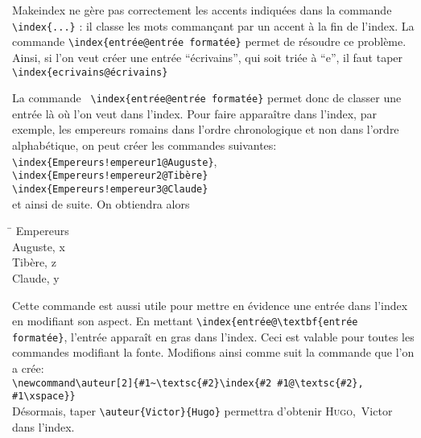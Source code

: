 Makeindex ne gère pas correctement les accents indiquées dans la commande \verb+\index{...}+ : il classe les mots commançant par un accent à la fin de l'index. La commande \verb+\index{entrée@entrée formatée}+ permet de résoudre ce problème. Ainsi, si l'on veut créer une entrée \enquote{écrivains}, qui soit triée à \enquote{e}, il faut taper \verb+\index{ecrivains@écrivains}+

La commande \verb+ \index{entrée@entrée formatée}+ permet donc de classer une entrée là où l'on veut dans l'index. Pour faire apparaître dans l'index, par exemple, les empereurs romains dans l'ordre chronologique et non dans l'ordre alphabétique, on peut créer les commandes suivantes:\\
\verb+\index{Empereurs!empereur1@Auguste}+,\\ \verb+\index{Empereurs!empereur2@Tibère}+\\
\verb+\index{Empereurs!empereur3@Claude}+\\
et ainsi de suite. On obtiendra alors
\begin{tabbing}
\hspace{0,5cm} \= \kill
Empereurs\\
\> Auguste, x\\
\> Tibère, z\\
\> Claude, y \\

\end{tabbing}

Cette commande est aussi utile pour mettre en évidence une entrée dans l'index en modifiant son aspect. En mettant \verb+\index{entrée@\textbf{entrée formatée}+, l'entrée apparaît en gras dans l'index. Ceci est valable pour toutes les commandes modifiant la fonte. Modifions ainsi comme suit la commande  que l'on a crée:\\
\verb+\newcommand\auteur[2]{#1~\textsc{#2}\index{#2 #1@\textsc{#2}, #1\xspace}}+\\
Désormais, taper \verb|\auteur{Victor}{Hugo}| permettra d'obtenir \textsc{Hugo},~Victor dans l'index.
 
 
 
